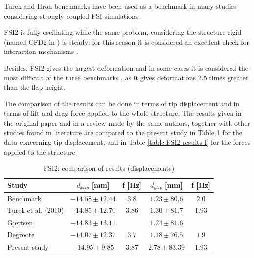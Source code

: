 Turek and Hron benchmarks have been used as a benchmark in many studies considering strongly coupled FSI simulations. 

FSI2 is fully oscillating while the same problem, considering the structure rigid (named CFD2 in \cite{turek2006proposal}) is steady: for this reason it is considered an excellent check for interaction mechanisms \cite{turek2010numerical}.

Besides, FSI2 gives the largest deformation and in some cases it is considered the most difficult of the three benchmarks \cite{richter2015time}, as it gives deformations 2.5 times greater than the flap height.

The comparison of the results can be done in terms of tip displacement and in terms of lift and drag force applied to the whole structure. The results given in the original paper and in a review made by the same authors, together with other studies found in literature are compared to the present study in Table \ref{table:FSI2-results-d} for the data concerning tip displacement, and in Table \ref{table:FSI2-results-f} for the forces applied to the structure.


\begin{table}[!htb]
	\begin{center}
		\begin{tabular}{ l | c c | c c  |  } 
			Study & $d_{x tip}$ [\si{mm}] & f [\si{Hz}] & $d_{y tip}$ [\si{mm}] & f [\si{Hz}] \\ 
			\hline
			\hline
			Benchmark  \cite{turek2006proposal} & $-14.58\pm12.44$ & $3.8$ & $1.23\pm80.6$ & $2.0$     \\
			Turek et al. (2010) \cite{turek2010numerical} & $-14.85\pm12.70$ & $3.86$ & $1.30\pm81.7$ & $1.93$ \\
			Gjertsen \cite{gjertsen2017development} & $-14.83\pm13.11$ & & $1.24\pm81.6$ & \\
			Degroote \cite{degroote2009interface}  & $-14.07\pm12.37$ & $3.7$ & $1.18\pm76.5$ & $1.9$ \\
			\hline
			Present study & $-14.95\pm9.85$ & $3.87$ & $2.78\pm83.39$ & $1.93$ \\ 
		\end{tabular}
	\end{center}
	\caption{FSI2: comparison of results (displacements)}
	\label{table:FSI2-results-d}
\end{table}

